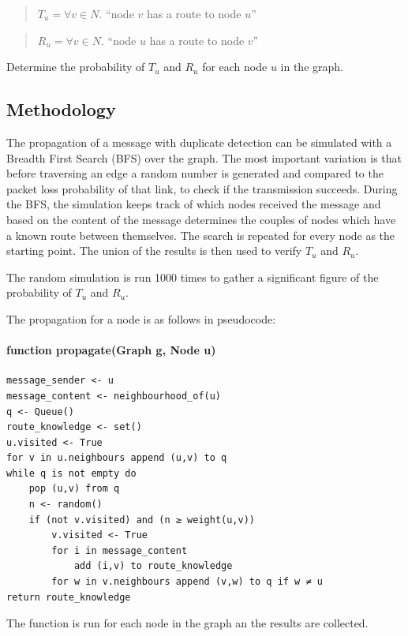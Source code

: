 \documentclass[oneside,openany]{memoir}
\begin{document}
\begin{quote}
$T_u = \forall v \in N .$ ``node $v$ has a route to node $u$''
\end{quote}

\begin{quote}
$R_u = \forall v \in N .$ ``node $u$ has a route to node $v$''
\end{quote}

Determine the probability of $T_u$ and $R_u$ for each node $u$ in the
graph.

\subsection{Methodology}\label{methodology-1}

The propagation of a message with duplicate detection can be simulated
with a Breadth First Search (BFS) over the graph. The most important
variation is that before traversing an edge a random number is generated
and compared to the packet loss probability of that link, to check if
the transmission succeeds. During the BFS, the simulation keeps track of
which nodes received the message and based on the content of the message
determines the couples of nodes which have a known route between
themselves. The search is repeated for every node as the starting point.
The union of the results is then used to verify $T_u$ and $R_u$.

The random simulation is run 1000 times to gather a significant figure
of the probability of $T_u$ and $R_u$.

The propagation for a node is as follows in pseudocode:

\paragraph{function propagate(Graph g, Node
u)}\label{function-propagategraph-g-node-u}

\begin{verbatim}
message_sender <- u
message_content <- neighbourhood_of(u)
q <- Queue()
route_knowledge <- set()
u.visited <- True
for v in u.neighbours append (u,v) to q
while q is not empty do
    pop (u,v) from q
    n <- random()
    if (not v.visited) and (n ≥ weight(u,v))
        v.visited <- True
        for i in message_content
            add (i,v) to route_knowledge
        for w in v.neighbours append (v,w) to q if w ≠ u
return route_knowledge
\end{verbatim}

The function is run for each node in the graph an the results are
collected.
\end{document}
